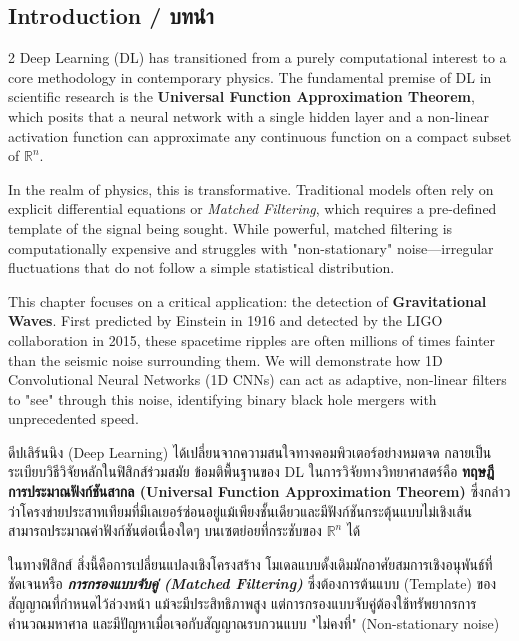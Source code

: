 \subsection{Introduction \quad / \quad \textthai{บทนำ}}
\begin{paracol}{2}
Deep Learning (DL) has transitioned from a purely computational interest to a core methodology in contemporary physics. The fundamental premise of DL in scientific research is the \textbf{Universal Function Approximation Theorem}, which posits that a neural network with a single hidden layer and a non-linear activation function can approximate any continuous function on a compact subset of $\mathbb{R}^n$. 

In the realm of physics, this is transformative. Traditional models often rely on explicit differential equations or \textit{Matched Filtering}, which requires a pre-defined template of the signal being sought. While powerful, matched filtering is computationally expensive and struggles with "non-stationary" noise—irregular fluctuations that do not follow a simple statistical distribution. 

This chapter focuses on a critical application: the detection of \textbf{Gravitational Waves}. First predicted by Einstein in 1916 and detected by the LIGO collaboration in 2015, these spacetime ripples are often millions of times fainter than the seismic noise surrounding them. We will demonstrate how 1D Convolutional Neural Networks (1D CNNs) can act as adaptive, non-linear filters to "see" through this noise, identifying binary black hole mergers with unprecedented speed.

\switchcolumn

\begin{thai}
ดีปเลิร์นนิง (Deep Learning) ได้เปลี่ยนจากความสนใจทางคอมพิวเตอร์อย่างหมดจด กลายเป็นระเบียบวิธีวิจัยหลักในฟิสิกส์ร่วมสมัย ข้อมติพื้นฐานของ DL ในการวิจัยทางวิทยาศาสตร์คือ \textbf{ทฤษฎีการประมาณฟังก์ชันสากล (Universal Function Approximation Theorem)} ซึ่งกล่าวว่าโครงข่ายประสาทเทียมที่มีเลเยอร์ซ่อนอยู่แม้เพียงชั้นเดียวและมีฟังก์ชันกระตุ้นแบบไม่เชิงเส้น สามารถประมาณค่าฟังก์ชันต่อเนื่องใดๆ บนเซตย่อยที่กระชับของ $\mathbb{R}^n$ ได้

ในทางฟิสิกส์ สิ่งนี้คือการเปลี่ยนแปลงเชิงโครงสร้าง โมเดลแบบดั้งเดิมมักอาศัยสมการเชิงอนุพันธ์ที่ชัดเจนหรือ \textit{\textbf{การกรองแบบจับคู่ (Matched Filtering)}} ซึ่งต้องการต้นแบบ (Template) ของสัญญาณที่กำหนดไว้ล่วงหน้า แม้จะมีประสิทธิภาพสูง แต่การกรองแบบจับคู่ต้องใช้ทรัพยากรการคำนวณมหาศาล และมีปัญหาเมื่อเจอกับสัญญาณรบกวนแบบ "ไม่คงที่" (Non-stationary noise)


\end{thai}
\end{paracol}
